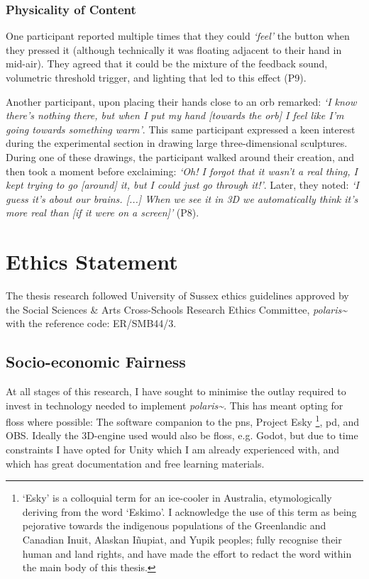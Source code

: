 \subsubsection{Physicality of Content}\label{sec: polaris-feedback-immersion-physicality}
One participant reported multiple times that they could \textit{`feel'} the button when they pressed it (although technically it was floating adjacent to their hand in mid-air). They agreed that it could be the mixture of the feedback sound, volumetric threshold trigger, and lighting that led to this effect (P9).

Another participant, upon placing their hands close to an orb remarked: \textit{`I know there's nothing there, but when I put my hand [towards the orb] I feel like I'm going towards something warm'}. This same participant expressed a keen interest during the experimental section in drawing large three-dimensional sculptures. During one of these drawings, the participant walked around their creation, and then took a moment before exclaiming: \textit{`Oh! I forgot that it wasn't a real thing, I kept trying to go [around] it, but I could just go through it!'}. Later, they noted: \textit{`I guess it's about our brains. [...] When we see it in 3D we automatically think it's more real than [if it were on a screen]'} (P8).

\section{Ethics Statement}\label{sec: polaris-ethics}
The thesis research followed University of Sussex ethics guidelines approved by the Social Sciences \& Arts Cross-Schools Research Ethics Committee, \textit{polaris\textasciitilde{}} with the reference code: ER/SMB44/3.

\subsection{Socio-economic Fairness}\label{sec: polaris-ethics-}
At all stages of this research, I have sought to minimise the outlay required to invest in technology needed to implement \textit{polaris\textasciitilde{}}. This has meant opting for \gls{floss} where possible: The software companion to the \gls{pns}, Project Esky \footnote{`Esky' is a colloquial term for an ice-cooler in Australia, etymologically deriving from the word `Eskimo'. I acknowledge the use of this term as being pejorative towards the indigenous populations of the Greenlandic and Canadian Inuit, Alaskan Iñupiat, and Yupik peoples; fully recognise their human and land rights, and have made the effort to redact the word within the main body of this thesis.}, \gls{pd}, and OBS. Ideally the 3D-engine used would also be \gls{floss}, e.g. Godot, but due to time constraints I have opted for Unity which I am already experienced with, and which has great documentation and free learning materials.

